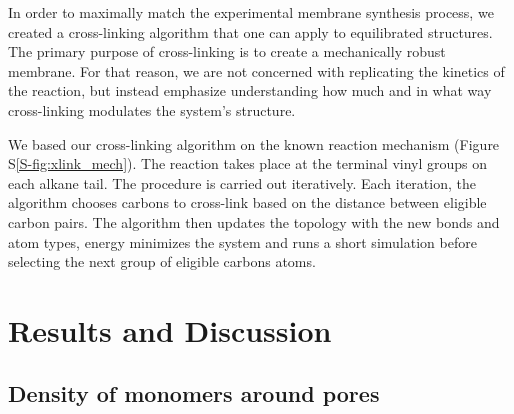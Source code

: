 \documentclass[journal=jpcbfk,manuscript=article]{achemso}
\begin{document}
  In order to maximally match the experimental membrane synthesis process,
  we created a cross-linking algorithm that one can apply to equilibrated structures. 
  The primary purpose of cross-linking is to create a mechanically robust membrane.
  For that reason, we are not concerned with replicating the kinetics of the reaction, 
  but instead emphasize understanding how much and in what way cross-linking modulates
  the system's structure.

  We based our cross-linking algorithm on the known reaction mechanism 
  (Figure S\ref{S-fig:xlink_mech}). The reaction takes place at the terminal vinyl groups
  on each alkane tail. The procedure is carried out iteratively. Each iteration, the
  algorithm chooses carbons to cross-link based on the distance between eligible 
  carbon pairs. The algorithm then updates the topology with the new bonds and atom
  types, energy minimizes the system and runs a short simulation before selecting 
  the next group of eligible carbons atoms.

  \section{Results and Discussion}
  
  \subsection{Density of monomers around pores}

%  
  
\end{document}
